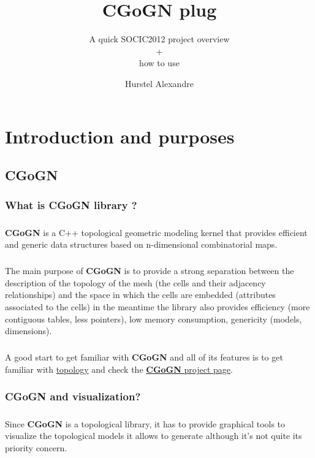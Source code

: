 \documentclass[a4paper]{scrreprt}
\title{CGoGN plug}
\author{Hurstel Alexandre}
\subtitle{A quick SOCIC2012 project overview\\+\\how to use}
\begin{document}
\maketitle

\tableofcontents

\chapter{Introduction and purposes}

\section{CGoGN}
\subsection{What is CGoGN library ?}
	\paragraph{}
	\textbf{CGoGN} is a C++ topological geometric modeling kernel that provides
	efficient and generic data structures based on n-dimensional combinatorial maps.

	\paragraph{}
	The main purpose of \textbf{CGoGN} is to provide a strong separation between
	the description of the topology of the mesh (the cells and their adjacency
	relationships) and the space in which the cells are embedded (attributes
	associated to the cells) in the meantime the library also provides efficiency
	(more contiguous tables, less pointers), low memory consumption, genericity
	(models, dimensions).
	
	\paragraph{}
	A good start to get familiar with \textbf{CGoGN} and all of its features is to
	get familiar with \href{http://en.wikipedia.org/wiki/Topology}{topology} and
	check the \href{http://cgogn.u-strasbg.fr/Wiki/index.php/CGoGN}{\textbf{CGoGN}
	project page}.
	
\subsection{CGoGN and visualization?}
	\paragraph{}
	Since \textbf{CGoGN} is a topological library, it has to provide graphical
	tools to visualize the topological models it allows to generate although it's
	not quite its priority concern.
	
\end{document}
